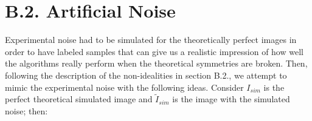 \documentclass[11pt, a4paper, twoside]{article} %
\begin{document}
\section*{B.2. Artificial Noise \vspace{-0.3cm}
}
Experimental noise had to be simulated for the theoretically perfect images in order to have labeled samples that can  give us a realistic impression of how well the algorithms really perform when the theoretical symmetries are broken. Then, following the description of the non-idealities in section B.2., we attempt to mimic the experimental noise with the following ideas. Consider $I_{sim}$ is the perfect theoretical simulated image and $\tilde{I}_{sim}$ is the image with the simulated noise; then:
\end{document}
